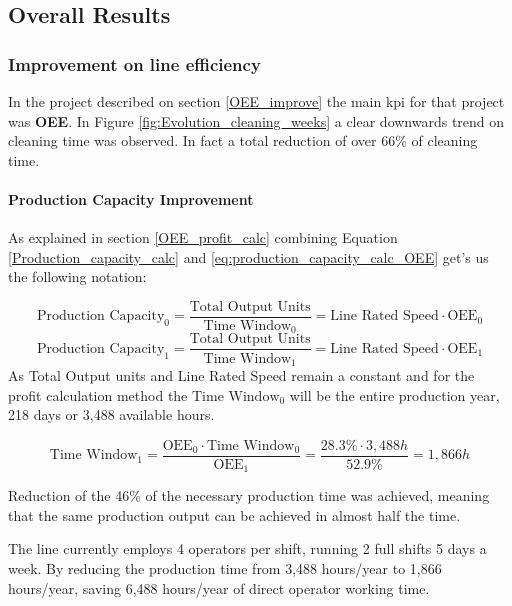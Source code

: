 \documentclass[]{article}
\begin{document}
\clearpage
\newpage
\subsection{Overall Results}\label{overall_results}

\subsubsection{Improvement on line efficiency}
In the project described on section \ref{OEE_improve} the main \gls{kpi} for that project was \textbf{OEE}. In Figure \ref{fig:Evolution_cleaning_weeks} a clear downwards trend on cleaning time was observed. In fact a total reduction of over 66\% of cleaning time. 

\paragraph{Production Capacity Improvement}

As explained in section \ref{OEE_profit_calc} combining Equation \ref{Production_capacity_calc} and \ref{eq:production_capacity_calc_OEE} get's us the following notation:

\begin{equation}
  \text{Production Capacity}_{0}
    = \frac{\text{Total Output Units}}{\text{Time Window}_{0}}
    = \text{Line Rated Speed} \cdot \text{OEE}_{0}
  \end{equation}
  \begin{equation}
  \text{Production Capacity}_{1}
    = \frac{\text{Total Output Units}}{\text{Time Window}_{1}}
    = \text{Line Rated Speed} \cdot \text{OEE}_{1}
\end{equation}
As Total Output units and Line Rated Speed remain a constant and for the profit calculation method the $\text{Time Window}_{0}$ will be the entire production year, 218 days or 3,488 available hours.

\begin{equation}
  \text{Time Window}_{1}=\frac{\text{OEE}_{0} \cdot \text{Time Window}_{0}}{\text{OEE}_{1}}=\frac{28.3\% \cdot 3,488h}{52.9\%}=1,866h
\end{equation}

Reduction of the 46\% of the necessary production time was achieved, meaning that the same production output can be achieved in almost half the time.

The line currently employs 4 operators per shift, running 2 full shifts 5 days a week.
By reducing the production time from 3,488 hours/year to 1,866 hours/year, saving 6,488 hours/year of direct operator working time.
\end{document}
